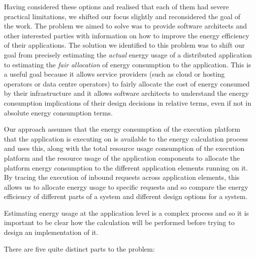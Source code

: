 Having considered these options and realised that each of them had severe practical limitations, we shifted our focus slightly and reconsidered the goal of the work.  The problem we aimed to solve was to provide software architects and other interested parties with information on how to improve the energy efficiency of their applications.  The solution we identified to this problem was to shift our  goal from precisely estimating the \emph{actual} energy usage of a distributed application to estimating the \emph{fair allocation} of energy consumption to the application.  This is a useful goal because it allows service providers (such as cloud or hosting operators or data centre operators) to fairly allocate the cost of energy consumed by their infrastructure and it allows software architects to understand the energy consumption implications of their design decisions in relative terms, even if not in absolute energy consumption terms.

Our approach assumes that the energy consumption of the execution platform that the application is executing on is available to the energy calculation process and uses this, along with the total resource usage consumption of the execution platform and the resource usage of the application components to allocate the platform energy consumption to the different application elements running on it.  By tracing the execution of inbound requests across application elements, this allows us to allocate energy usage to specific requests and so compare the energy efficiency of different parts of a system and different design options for a system.

Estimating energy usage at the application level is a complex process and so it is important to be clear how the calculation will be performed before trying to design an implementation of it.

There are five quite distinct parts to the problem:

